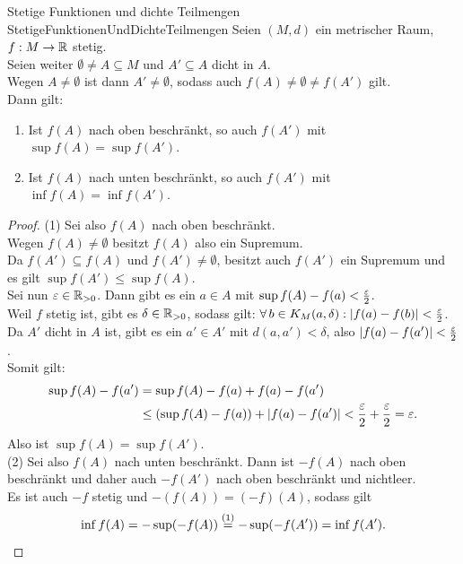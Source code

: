 \begin{lemma}{Stetige Funktionen und dichte Teilmengen}
             {StetigeFunktionenUndDichteTeilmengen}
Seien $(M, d)$ ein metrischer Raum, $f: M \rightarrow \mathbb{R}$ stetig.\\
Seien weiter $\emptyset \neq A \subseteq M$ und $A'\subseteq A$ dicht in $A$.\\
Wegen $A \neq \emptyset$ ist dann $A' \neq \emptyset$, sodass auch
$f(A)\neq\emptyset\neq f(A')$ gilt.\\
Dann gilt:
\begin{enumerate}[(1)]
  \item \label{StetigeFunktionenUndDichteTeilmengen1}
	Ist $f(A)$ nach oben beschränkt, so auch $f(A')$ mit
	 $\sup f(A) = \sup f(A')$.
	\item \label{StetigeFunktionenUndDichteTeilmengen2}
	Ist $f(A)$ nach unten beschränkt, so auch $f(A')$ mit 
	$\inf f(A) = \inf f(A')$.
\end{enumerate}
\end{lemma}
\begin{proof}
(1) Sei also $f(A)$ nach oben beschränkt.\\
Wegen $f(A) \neq \emptyset$ besitzt $f(A)$ also ein Supremum.\\
Da $f(A') \subseteq f(A)$ und $f(A') \neq \emptyset$, besitzt
auch $f(A')$ ein Supremum und es gilt $\sup f (A') \le \sup f(A)$.\\
Sei nun $\varepsilon \in \mathbb{R}_{>0}$.
Dann gibt es ein $a \in A$ mit $\sup f(A) - f(a) < \frac {\varepsilon} 2$.\\
Weil $f$ stetig ist, gibt es $\delta \in \mathbb{R}_{>0}$, sodass gilt:
$\forall\, b \in K_M(a,\delta): \left|f(a)-f(b)\right| < \frac {\varepsilon} 2$.\\
Da $A'$ dicht in $A$ ist, gibt es ein $a' \in A'$ mit $d(a, a') < \delta$,
also $\left|f(a)-f(a')\right|< \frac {\varepsilon} 2$.\\
Somit gilt:
\begin{align*}
\sup f(A) - f(a') & = \sup f(A) - f(a) + f(a) -f(a')\\
&\le(\sup f(A)-f(a))+\left|f(a)-f(a')\right|<\frac{\varepsilon} 2+\frac{\varepsilon} 2 = \varepsilon\text.
\end{align*}
Also ist $\sup f(A) = \sup f(A')$.\\
(2) Sei also $f(A)$ nach unten beschränkt. Dann ist $-f(A)$ nach oben
beschränkt und daher auch $-f(A')$ nach oben beschränkt und nichtleer.\\
Es ist auch $-f$ stetig und $-(f(A)) = (-f)(A)$, sodass gilt \[
\inf f(A) = - \sup(-f(A)) \overset{(1)}= -\sup(-f(A'))= \inf f(A')\text. \]
\end{proof}